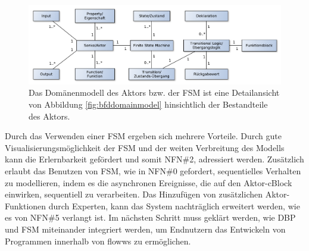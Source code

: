 \begin{figure}[h]
  \centering
  \includegraphics[width=1\textwidth]{bilder/chapter4/chapter4_2/domainmodellaktor.pdf}
  \caption{Das Domänenmodell des Aktors bzw. der \ac{FSM} ist eine Detailansicht von Abbildung \ref{fig:bfddomainmodel} hinsichtlich der Bestandteile des Aktors. }
  \label{fig:domainmodelfsm}
\end{figure}

Durch das Verwenden einer \ac{FSM} ergeben sich mehrere Vorteile. Durch gute Visualisierungsmöglichkeit der \ac{FSM} und der weiten Verbreitung des Modells kann die Erlernbarkeit gefördert und somit NFN\#2, adressiert werden. Zusätzlich erlaubt das Benutzen von \ac{FSM}, wie in  NFN\#0 gefordert, sequentielles Verhalten zu modellieren, indem es die asynchronen Ereignisse, die auf den Aktor-cBlock einwirken, sequentiell zu verarbeiten. Das Hinzufügen von zusätzlichen Aktor-Funktionen durch Experten, kann das System nachträglich erweitert werden, wie es von NFN\#5 verlangt ist. Im nächsten Schritt muss geklärt werden, wie \ac{DBP} und \ac{FSM} miteinander integriert werden, um Endnutzern das Entwickeln von Programmen innerhalb von flowws zu ermöglichen.